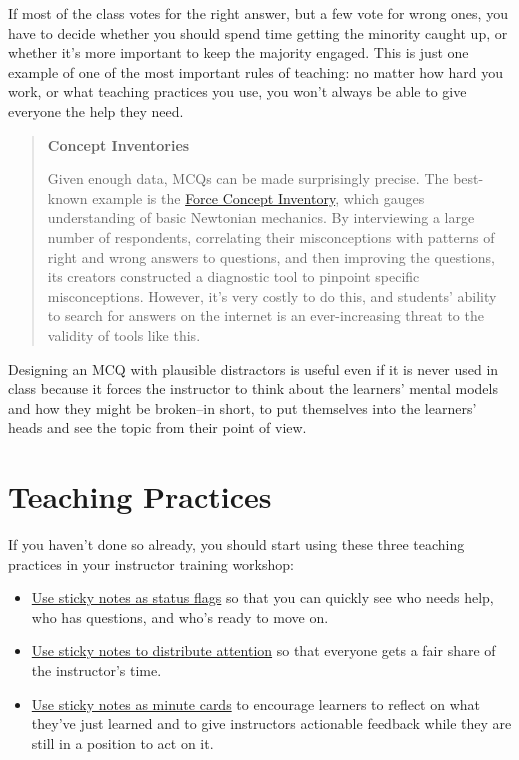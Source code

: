 \documentclass[10pt,statementpaper]{memoir}
\begin{document}
If most of the class votes for the right answer, but a few vote for
wrong ones, you have to decide whether you should spend time getting the
minority caught up, or whether it's more important to keep the majority
engaged. This is just one example of one of the most important rules of
teaching: no matter how hard you work, or what teaching practices you
use, you won't always be able to give everyone the help they need.

\begin{quote}
\textbf{Concept Inventories}

Given enough data, MCQs can be made surprisingly precise. The best-known
example is the
\href{https://en.wikipedia.org/wiki/Force_Concept_Inventory}{Force
Concept Inventory}, which gauges understanding of basic Newtonian
mechanics. By interviewing a large number of respondents, correlating
their misconceptions with patterns of right and wrong answers to
questions, and then improving the questions, its creators constructed a
diagnostic tool to pinpoint specific misconceptions. However, it's very
costly to do this, and students' ability to search for answers on the
internet is an ever-increasing threat to the validity of tools like
this.
\end{quote}

Designing an MCQ with plausible distractors is useful even if it is
never used in class because it forces the instructor to think about the
learners' mental models and how they might be broken--in short, to put
themselves into the learners' heads and see the topic from their point
of view.

\section{Teaching Practices}\label{teaching-practices-1}

If you haven't done so already, you should start using these three
teaching practices in your instructor training workshop:

\begin{itemize}
\item
  \href{practices.html\#sticky-notes-as-status-flags}{Use sticky notes
  as status flags} so that you can quickly see who needs help, who has
  questions, and who's ready to move on.
\item
  \href{practices.html\#sticky-notes-to-distribute-attention}{Use sticky
  notes to distribute attention} so that everyone gets a fair share of
  the instructor's time.
\item
  \href{practices.html\#minute-cards}{Use sticky notes as minute cards}
  to encourage learners to reflect on what they've just learned and to
  give instructors actionable feedback while they are still in a
  position to act on it.
\end{itemize}
\end{document}
